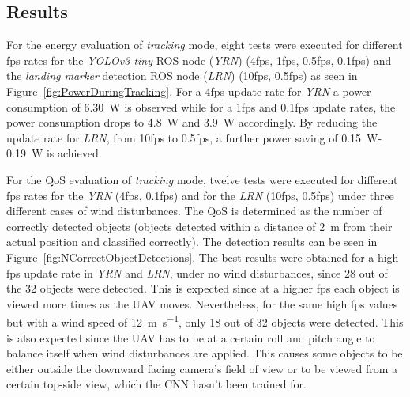 \documentclass[conference]{IEEEtran}
\begin{document}
\subsection{Results}

For the energy 
evaluation of \emph{tracking} mode, eight tests were executed for different fps rates 
for the \emph{YOLOv3-tiny} ROS node (\emph{YRN}) (4fps, 1fps, 0.5fps, 0.1fps) and 
the \emph{landing marker} detection ROS node (\emph{LRN}) (10fps, 0.5fps) as 
%
seen in Figure~\ref{fig:PowerDuringTracking}. For a 4fps update rate
for \emph{YRN}
a power consumption of \SI{6.30}{\watt} is observed while
for a 1fps and 0.1fps update rates, the power consumption drops to
\SI{4,8}{\watt} and \SI{3.9}{\watt} accordingly. By reducing the update rate for \emph{LRN},
from 10fps to 0.5fps, a further power
saving of \SI{0.15}{\watt}- \SI{0.19}{\watt} is achieved.



For the QoS evaluation of \emph{tracking} mode, twelve tests were executed for different 
fps rates for the \emph{YRN}
 (4fps, 0.1fps) and for 
the \emph{LRN}
 (10fps, 0.5fps) under 
three different cases of wind disturbances. 
%
The QoS is determined as the number of correctly detected objects (objects detected within a distance of \SI{2}{\meter} from their actual position and classified correctly). 
%
The detection results can be seen in
Figure~\ref{fig:NCorrectObjectDetections}. The best results were
obtained for a high fps update rate in \emph{YRN} %
 and \emph{LRN},
under no wind disturbances, since 28 out of the 32
objects were detected. This is expected since at a higher fps each object is viewed more times as the UAV moves. Nevertheless, for the same high fps values but
with a wind speed of \SI{12}{\meter \per \second}, only 18 out of 32 objects were detected. This is also expected since the UAV has to be at a certain roll and pitch angle to balance itself when wind disturbances are applied. This causes some objects to be either outside the downward facing camera's field of view or to be viewed from a certain top-side view, which the CNN hasn't been trained for.
\end{document}
